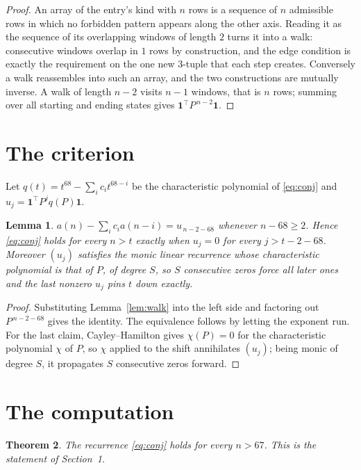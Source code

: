 \documentclass[11pt,a4paper]{article}
\theoremstyle{plain}
\newtheorem{theorem}{Theorem}
\newtheorem{lemma}[theorem]{Lemma}
\theoremstyle{definition}
\begin{document}
\begin{proof}
An array of the entry's kind with $n$ rows is a sequence of $n$ admissible rows in
which no forbidden pattern appears along the other axis. Reading it as the sequence of its
overlapping windows of length $2$ turns it into a walk: consecutive windows overlap in
$1$ rows by construction, and the edge condition is exactly the requirement on the one
new $3$-tuple that each step creates. Conversely a walk reassembles into such an array,
and the two constructions are mutually inverse. A walk of length $n-2$ visits $n-1$
windows, that is $n$ rows; summing over all starting and ending states gives
$\mathbf{1}^{\!\top}P^{\,n-2}\mathbf{1}$.
\end{proof}

\section{The criterion}

Let $q(t)=t^{68}-\sum_i c_i t^{68-i}$ be the characteristic polynomial of
\eqref{eq:conj} and $u_j=\mathbf{1}^{\!\top}P^{j}q(P)\mathbf{1}$.

\begin{lemma}\label{lem:crit}
$a(n)-\sum_i c_i a(n-i)=u_{\,n-2-68}$ whenever $n-68\ge2$. Hence
\eqref{eq:conj} holds for every $n>t$ exactly when $u_j=0$ for every
$j>t-2-68$. Moreover $(u_j)$ satisfies the monic linear recurrence whose
characteristic polynomial is that of $P$, of degree $S$, so $S$ consecutive zeros force all
later ones and the last nonzero $u_j$ pins $t$ down exactly.
\end{lemma}

\begin{proof}
Substituting Lemma~\ref{lem:walk} into the left side and factoring out
$P^{\,n-2-68}$ gives the identity. The equivalence follows by letting the exponent
run. For the last claim, Cayley--Hamilton gives $\chi(P)=0$ for the characteristic
polynomial $\chi$ of $P$, so $\chi$ applied to the shift annihilates $(u_j)$; being monic of
degree $S$, it propagates $S$ consecutive zeros forward.
\end{proof}

\section{The computation}

\begin{theorem}
The recurrence \eqref{eq:conj} holds for every $n>67$. This is the statement of
Section~1.
\end{theorem}
\end{document}
